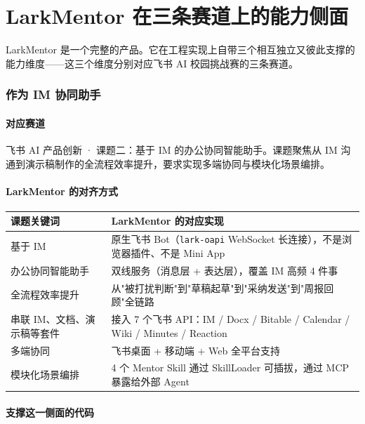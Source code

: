 \documentclass[11pt,a4paper]{ctexart}
\begin{document}
\part{LarkMentor 在三条赛道上的能力侧面}

LarkMentor 是一个完整的产品。它在工程实现上自带三个相互独立又彼此支撑的能力维度——这三个维度分别对应飞书 AI 校园挑战赛的三条赛道。

\section{作为 IM 协同助手}

\subsection{对应赛道}
飞书 AI 产品创新 · 课题二：基于 IM 的办公协同智能助手。课题聚焦从 IM 沟通到演示稿制作的全流程效率提升，要求实现多端协同与模块化场景编排。

\subsection{LarkMentor 的对齐方式}

\begin{tabular}{p{4.5cm}p{10cm}}
\toprule
\textbf{课题关键词} & \textbf{LarkMentor 的对应实现} \\
\midrule
基于 IM & 原生飞书 Bot（\texttt{lark-oapi} WebSocket 长连接），不是浏览器插件、不是 Mini App \\
办公协同智能助手 & 双线服务（消息层 + 表达层），覆盖 IM 高频 4 件事 \\
全流程效率提升 & 从"被打扰判断"到"草稿起草"到"采纳发送"到"周报回顾"全链路 \\
串联 IM、文档、演示稿等套件 & 接入 7 个飞书 API：IM / Docx / Bitable / Calendar / Wiki / Minutes / Reaction \\
多端协同 & 飞书桌面 + 移动端 + Web 全平台支持 \\
模块化场景编排 & 4 个 Mentor Skill 通过 SkillLoader 可插拔，通过 MCP 暴露给外部 Agent \\
\bottomrule
\end{tabular}

\subsection{支撑这一侧面的代码}
\end{document}
